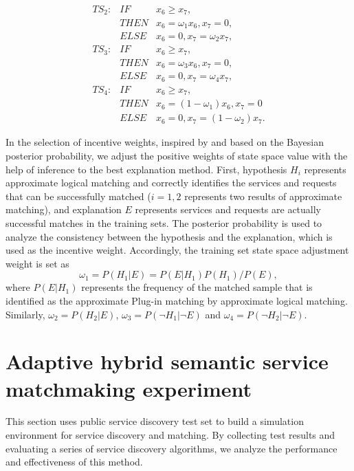 \documentclass{ieeeaccess}
\begin{document}
\begin{align}
TS_{2}: & IF &x_{6} \ge x_{7},\nonumber\\ & THEN &x_{6}=\omega_{1}x_{6}, x_{7}=0, \nonumber\\ & ELSE &x_{6}=0, x_{7} = \omega_{2}x_{7},\nonumber\\
TS_{3}: & IF &x_{6} \ge x_{7},\nonumber\\ & THEN &x_{6}=\omega_{3}x_{6}, x_{7}=0, \nonumber\\ & ELSE &x_{6}=0, x_{7} = \omega_{4}x_{7},\nonumber\\
TS_{4}: & IF &x_{6} \ge x_{7},\nonumber\\ & THEN &x_{6}=(1-\omega_{1})x_{6}, x_{7}=0 \nonumber\\ & ELSE &x_{6}=0, x_{7} = (1-\omega_{2})x_{7}.
\end{align}


In the selection of incentive weights, inspired by \cite{glass2009inference} and based on the Bayesian posterior probability, we adjust the positive weights of state space value with the help of inference to the best explanation method. First, hypothesis $H_{i}$ represents approximate logical matching and correctly identifies the services and requests that can be successfully matched ($i=1,2$ represents two results of approximate matching), and explanation $E$ represents services and requests are actually successful matches in the training sets. The posterior probability is used to analyze the consistency between the hypothesis and the explanation, which is used as the incentive weight. Accordingly, the training set state space adjustment weight is set as 
\begin{equation}
\omega_{1} = P(H_{1}|E) = P(E|H_{1}) P(H_{1})/P(E),
\end{equation}
where $P(E|H_{1})$ represents the frequency of the matched sample that is identified as the approximate Plug-in matching by approximate logical matching. Similarly, $\omega_{2}=P(H_{2}|E)$, $\omega_{3}=P(\neg H_{1}|\neg E)$ and $\omega_{4}=P( \neg H_{2}| \neg E)$.

\section{Adaptive hybrid semantic service matchmaking experiment}
This section uses public service discovery test set to build a simulation environment for service discovery and matching. By collecting test results and evaluating a series of service discovery algorithms, we analyze the performance and effectiveness of this method.
\end{document}
